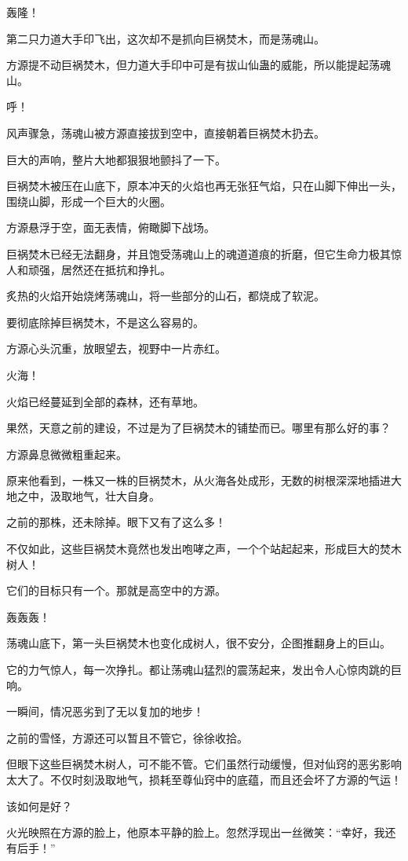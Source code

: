 \begin{this_body}
轰隆！

第二只力道大手印飞出，这次却不是抓向巨祸焚木，而是荡魂山。

方源提不动巨祸焚木，但力道大手印中可是有拔山仙蛊的威能，所以能提起荡魂山。

呼！

风声骤急，荡魂山被方源直接拔到空中，直接朝着巨祸焚木扔去。

巨大的声响，整片大地都狠狠地颤抖了一下。

巨祸焚木被压在山底下，原本冲天的火焰也再无张狂气焰，只在山脚下伸出一头，围绕山脚，形成一个巨大的火圈。

方源悬浮于空，面无表情，俯瞰脚下战场。

巨祸焚木已经无法翻身，并且饱受荡魂山上的魂道道痕的折磨，但它生命力极其惊人和顽强，居然还在抵抗和挣扎。

炙热的火焰开始烧烤荡魂山，将一些部分的山石，都烧成了软泥。

要彻底除掉巨祸焚木，不是这么容易的。

方源心头沉重，放眼望去，视野中一片赤红。

火海！

火焰已经蔓延到全部的森林，还有草地。

果然，天意之前的建设，不过是为了巨祸焚木的铺垫而已。哪里有那么好的事？

方源鼻息微微粗重起来。

原来他看到，一株又一株的巨祸焚木，从火海各处成形，无数的树根深深地插进大地之中，汲取地气，壮大自身。

之前的那株，还未除掉。眼下又有了这么多！

不仅如此，这些巨祸焚木竟然也发出咆哮之声，一个个站起起来，形成巨大的焚木树人！

它们的目标只有一个。那就是高空中的方源。

轰轰轰！

荡魂山底下，第一头巨祸焚木也变化成树人，很不安分，企图推翻身上的巨山。

它的力气惊人，每一次挣扎。都让荡魂山猛烈的震荡起来，发出令人心惊肉跳的巨响。

一瞬间，情况恶劣到了无以复加的地步！

之前的雪怪，方源还可以暂且不管它，徐徐收拾。

但眼下这些巨祸焚木树人，可不能不管。它们虽然行动缓慢，但对仙窍的恶劣影响太大了。不仅时刻汲取地气，损耗至尊仙窍中的底蕴，而且还会坏了方源的气运！

该如何是好？

火光映照在方源的脸上，他原本平静的脸上。忽然浮现出一丝微笑：“幸好，我还有后手！”


\end{this_body}
